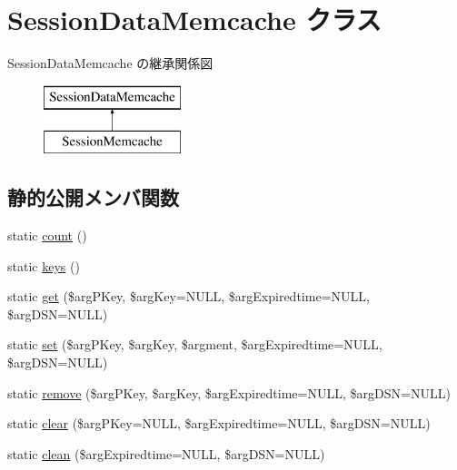 \hypertarget{class_session_data_memcache}{}\section{Session\+Data\+Memcache クラス}
\label{class_session_data_memcache}
Session\+Data\+Memcache の継承関係図\begin{figure}[H]
\begin{center}
\leavevmode
\includegraphics[height=2.000000cm]{class_session_data_memcache}
\end{center}
\end{figure}
\subsection*{静的公開メンバ関数}
\begin{DoxyCompactItemize}
\item 
static \hyperlink{class_session_data_memcache_a41ee61ffc192ecca6986be329897752f}{count} ()
\item 
static \hyperlink{class_session_data_memcache_af0d822a1b1cfa15344c03c762df345d2}{keys} ()
\item 
static \hyperlink{class_session_data_memcache_a2fcf53acfd7032e09e2a8465165c47e6}{get} (\$arg\+P\+Key, \$arg\+Key=N\+U\+L\+L, \$arg\+Expiredtime=N\+U\+L\+L, \$arg\+D\+S\+N=N\+U\+L\+L)
\item 
static \hyperlink{class_session_data_memcache_a7735cb0fc5b6c136ae76b19aba68173a}{set} (\$arg\+P\+Key, \$arg\+Key, \$argment, \$arg\+Expiredtime=N\+U\+L\+L, \$arg\+D\+S\+N=N\+U\+L\+L)
\item 
static \hyperlink{class_session_data_memcache_aa399bbfbd3f4706e952317f76aadfe01}{remove} (\$arg\+P\+Key, \$arg\+Key, \$arg\+Expiredtime=N\+U\+L\+L, \$arg\+D\+S\+N=N\+U\+L\+L)
\item 
static \hyperlink{class_session_data_memcache_af06195254f5eec93998c4eb2569bc140}{clear} (\$arg\+P\+Key=N\+U\+L\+L, \$arg\+Expiredtime=N\+U\+L\+L, \$arg\+D\+S\+N=N\+U\+L\+L)
\item 
static \hyperlink{class_session_data_memcache_af09867c8e3d262ee7c0aad65be21f7f4}{clean} (\$arg\+Expiredtime=N\+U\+L\+L, \$arg\+D\+S\+N=N\+U\+L\+L)
\end{DoxyCompactItemize}
